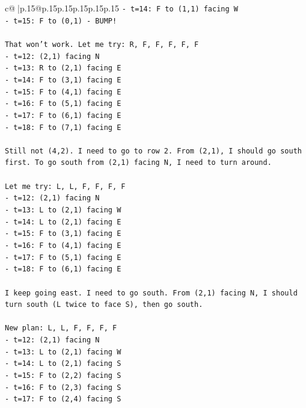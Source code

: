 \documentclass{article}
\begin{document}
{\begin{supertabular}{c@{$\;$}|p{.15\linewidth}@{}p{.15\linewidth}p{.15\linewidth}p{.15\linewidth}p{.15\linewidth}p{.15\linewidth}}
{{{\texttt{{-} t=14: F to (1,1) facing W} \\
\texttt{{-} t=15: F to (0,1) {-} BUMP!} \\
\\ 
\texttt{That won't work. Let me try: R, F, F, F, F, F} \\
\texttt{{-} t=12: (2,1) facing N} \\
\texttt{{-} t=13: R to (2,1) facing E} \\
\texttt{{-} t=14: F to (3,1) facing E} \\
\texttt{{-} t=15: F to (4,1) facing E} \\
\texttt{{-} t=16: F to (5,1) facing E} \\
\texttt{{-} t=17: F to (6,1) facing E} \\
\texttt{{-} t=18: F to (7,1) facing E} \\
\\ 
\texttt{Still not (4,2). I need to go to row 2. From (2,1), I should go south first. To go south from (2,1) facing N, I need to turn around.} \\
\\ 
\texttt{Let me try: L, L, F, F, F, F} \\
\texttt{{-} t=12: (2,1) facing N} \\
\texttt{{-} t=13: L to (2,1) facing W} \\
\texttt{{-} t=14: L to (2,1) facing E} \\
\texttt{{-} t=15: F to (3,1) facing E} \\
\texttt{{-} t=16: F to (4,1) facing E} \\
\texttt{{-} t=17: F to (5,1) facing E} \\
\texttt{{-} t=18: F to (6,1) facing E} \\
\\ 
\texttt{I keep going east. I need to go south. From (2,1) facing N, I should turn south (L twice to face S), then go south.} \\
\\ 
\texttt{New plan: L, L, F, F, F, F} \\
\texttt{{-} t=12: (2,1) facing N} \\
\texttt{{-} t=13: L to (2,1) facing W} \\
\texttt{{-} t=14: L to (2,1) facing S} \\
\texttt{{-} t=15: F to (2,2) facing S} \\
\texttt{{-} t=16: F to (2,3) facing S} \\
\texttt{{-} t=17: F to (2,4) facing S} \\
}}}
\end{supertabular}}
\end{document}
